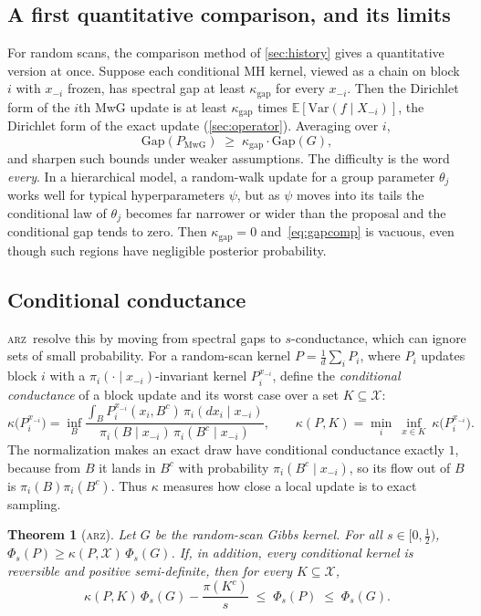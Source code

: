 \documentclass[11pt]{article}
\newtheorem{theorem}{Theorem}
\theoremstyle{remark}
\newcommand{\ARZ}{\textsc{arz}}
\newcommand{\Gap}{\mathrm{Gap}}
\newcommand{\E}{\mathbb{E}}
\newcommand{\X}{\mathcal{X}}
\begin{document}
\subsection{A first quantitative comparison, and its limits}
For random scans, the comparison method of \cref{sec:history} gives a quantitative version at once. Suppose each conditional MH kernel, viewed as a chain on block $i$ with $x_{-i}$ frozen, has spectral gap at least $\kappa_{\mathrm{gap}}$ for every $x_{-i}$. Then the Dirichlet form of the $i$th MwG update is at least $\kappa_{\mathrm{gap}}$ times $\E[\mathrm{Var}(f\mid X_{-i})]$, the Dirichlet form of the exact update (\cref{sec:operator}). Averaging over $i$,
\begin{equation}\label{eq:gapcomp}
\Gap(P_{\mathrm{MwG}})\;\ge\;\kappa_{\mathrm{gap}}\cdot\Gap(G),
\end{equation}
and \citet{qin2025spectral} sharpen such bounds under weaker assumptions. The difficulty is the word \emph{every}. In a hierarchical model, a random-walk update for a group parameter $\theta_j$ works well for typical hyperparameters $\psi$, but as $\psi$ moves into its tails the conditional law of $\theta_j$ becomes far narrower or wider than the proposal and the conditional gap tends to zero. Then $\kappa_{\mathrm{gap}}=0$ and~\eqref{eq:gapcomp} is vacuous, even though such regions have negligible posterior probability.

\subsection{Conditional conductance}\label{sec:arz}
\ARZ\ resolve this by moving from spectral gaps to $s$-conductance, which can ignore sets of small probability. For a random-scan kernel $P=\frac1d\sum_iP_i$, where $P_i$ updates block $i$ with a $\pi_i(\cdot\mid x_{-i})$-invariant kernel $P_i^{x_{-i}}$, define the \emph{conditional conductance} of a block update and its worst case over a set $K\subseteq\X$:
\[
\kappa\bigl(P_i^{x_{-i}}\bigr)=\inf_{B}\frac{\int_BP_i^{x_{-i}}(x_i,B^c)\,\pi_i(dx_i\mid x_{-i})}{\pi_i(B\mid x_{-i})\,\pi_i(B^c\mid x_{-i})},\qquad\kappa(P,K)=\min_i\ \inf_{x\in K}\ \kappa\bigl(P_i^{x_{-i}}\bigr).
\]
The normalization makes an exact draw have conditional conductance exactly $1$, because from $B$ it lands in $B^c$ with probability $\pi_i(B^c\mid x_{-i})$, so its flow out of $B$ is $\pi_i(B)\pi_i(B^c)$. Thus $\kappa$ measures how close a local update is to exact sampling.

\begin{theorem}[\ARZ]\label{thm:arz}
Let $G$ be the random-scan Gibbs kernel. For all $s\in[0,\frac12)$, $\Phi_s(P)\ge\kappa(P,\X)\,\Phi_s(G)$. If, in addition, every conditional kernel is reversible and positive semi-definite, then for every $K\subseteq\X$,
\[
\kappa(P,K)\,\Phi_s(G)-\frac{\pi(K^c)}{s}\;\le\;\Phi_s(P)\;\le\;\Phi_s(G).
\]
\end{theorem}
\end{document}
